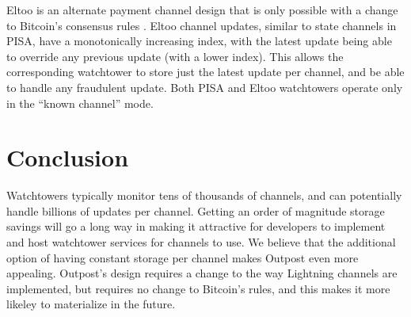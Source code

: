 Eltoo \cite{eltoo} is an alternate payment channel design that is only possible with a change to Bitcoin's consensus rules \cite{bip118}. Eltoo channel updates, similar to state channels in PISA, have a monotonically increasing index, with the latest update being able to override any previous update (with a lower index). This allows the corresponding watchtower to store just the latest update per channel, and be able to handle any fraudulent update. Both PISA and Eltoo watchtowers operate only in the ``known channel'' mode.

\section{Conclusion}
Watchtowers typically monitor tens of thousands of channels, and can potentially handle billions of updates per channel. Getting an order of magnitude storage savings will go a long way in making it attractive for developers to implement and host watchtower services for channels to use. We believe that the additional option of having constant storage per channel makes Outpost even more appealing. Outpost's design requires a change to the way Lightning channels are implemented, but requires no change to Bitcoin's rules, and this makes it more likeley to materialize in the future.